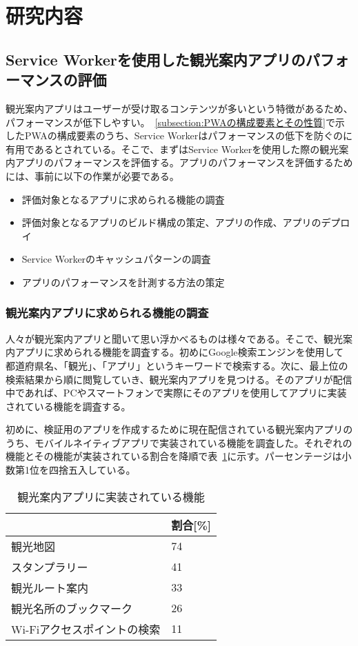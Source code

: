 \section{研究内容}
\label{section:研究内容}
\subsection{Service Workerを使用した観光案内アプリのパフォーマンスの評価}
\label{subsection:Service Workerを使用した観光案内アプリのパフォーマンスの評価}
観光案内アプリはユーザーが受け取るコンテンツが多いという特徴があるため、パフォーマンスが低下しやすい。~\autoref{subsection:PWAの構成要素とその性質}で示したPWAの構成要素のうち、Service Workerはパフォーマンスの低下を防ぐのに有用であるとされている。そこで、まずはService Workerを使用した際の観光案内アプリのパフォーマンスを評価する。アプリのパフォーマンスを評価するためには、事前に以下の作業が必要である。
\begin{itemize}
    \item 評価対象となるアプリに求められる機能の調査
    \item 評価対象となるアプリのビルド構成の策定、アプリの作成、アプリのデプロイ
    \item Service Workerのキャッシュパターンの調査
    \item アプリのパフォーマンスを計測する方法の策定
\end{itemize}
\subsubsection{観光案内アプリに求められる機能の調査}
\label{subsubsection:観光案内アプリに求められる機能の調査}
人々が観光案内アプリと聞いて思い浮かべるものは様々である。そこで、観光案内アプリに求められる機能を調査する。初めにGoogle検索エンジンを使用して都道府県名、「観光」、「アプリ」というキーワードで検索する。次に、最上位の検索結果から順に閲覧していき、観光案内アプリを見つける。そのアプリが配信中であれば、PCやスマートフォンで実際にそのアプリを使用してアプリに実装されている機能を調査する。

初めに、検証用のアプリを作成するために現在配信されている観光案内アプリのうち、モバイルネイティブアプリで実装されている機能を調査した。それぞれの機能とその機能が実装されている割合を降順で表~\ref{table:観光案内アプリに実装されている機能}に示す。パーセンテージは小数第1位を四捨五入している。
\begin{table}
  \caption{観光案内アプリに実装されている機能}
  \label{table:観光案内アプリに実装されている機能}
  \centering
  \begin{tabular}{|p{15em}|p{10em}|}
    \hline
    & 割合[\%] \\ \hline
    観光地図 & 74 \\ \hline
    スタンプラリー & 41\\ \hline
    観光ルート案内 & 33\\ \hline
    観光名所のブックマーク & 26\\ \hline
    Wi-Fiアクセスポイントの検索 & 11 \\ \hline
  \end{tabular}
\end{table}

